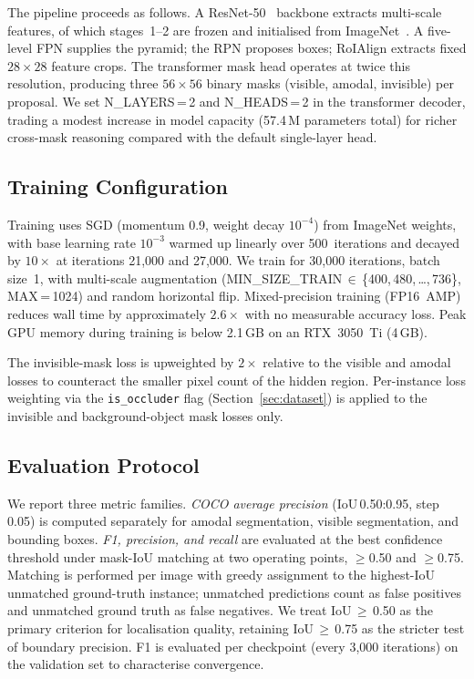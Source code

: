 \documentclass[conference]{IEEEtran}
\begin{document}
The pipeline proceeds as follows.
A ResNet-50~\cite{he2016resnet} backbone extracts multi-scale features,
of which stages~1--2 are frozen and initialised from ImageNet~\cite{deng2009imagenet}.
A five-level FPN supplies the pyramid; the RPN proposes boxes; RoIAlign
extracts fixed $28{\times}28$ feature crops.
The transformer mask head operates at twice this resolution, producing three
$56{\times}56$ binary masks (visible, amodal, invisible) per proposal.
We set N\_LAYERS\,=\,2 and N\_HEADS\,=\,2 in the transformer decoder,
trading a modest increase in model capacity (57.4\,M parameters total) for
richer cross-mask reasoning compared with the default single-layer head.

\subsection{Training Configuration}

Training uses SGD (momentum 0.9, weight decay $10^{-4}$) from ImageNet
weights, with base learning rate $10^{-3}$ warmed up linearly over
500~iterations and decayed by $10\times$ at iterations 21{,}000 and
27{,}000.
We train for 30{,}000 iterations, batch size~1, with multi-scale
augmentation
(MIN\_SIZE\_TRAIN\,$\in$\,\{400,\,480,\,\ldots,\,736\}, MAX\,=\,1024)
and random horizontal flip.
Mixed-precision training (FP16~AMP) reduces wall time by approximately
$2.6\times$ with no measurable accuracy loss.
Peak GPU memory during training is below 2.1\,GB on an RTX~3050~Ti (4\,GB).

The invisible-mask loss is upweighted by $2\times$ relative to the visible
and amodal losses to counteract the smaller pixel count of the hidden region.
Per-instance loss weighting via the \texttt{is\_occluder} flag
(Section~\ref{sec:dataset}) is applied to the invisible and
background-object mask losses only.

\subsection{Evaluation Protocol}

We report three metric families.
\emph{COCO average precision} (IoU\,0.50:0.95, step 0.05) is computed
separately for amodal segmentation, visible segmentation, and bounding boxes.
\emph{F1, precision, and recall} are evaluated at the best confidence
threshold under mask-IoU matching at two operating points,
$\geq$0.50 and $\geq$0.75.
Matching is performed per image with greedy assignment to the
highest-IoU unmatched ground-truth instance; unmatched predictions count as
false positives and unmatched ground truth as false negatives.
We treat IoU\,$\geq$\,0.50 as the primary criterion for localisation
quality, retaining IoU\,$\geq$\,0.75 as the stricter test of
boundary precision.
F1 is evaluated per checkpoint (every 3{,}000 iterations) on the
validation set to characterise convergence.
\end{document}
